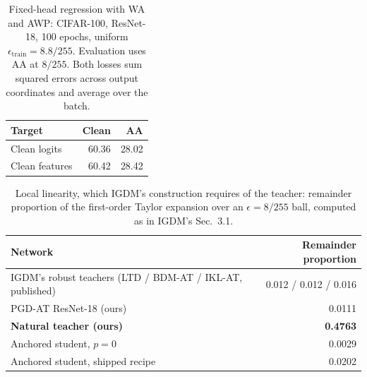 \begin{table}[!htbp]
  \centering \small \setlength{\tabcolsep}{6pt}
  \caption{Fixed-head regression with WA and AWP: CIFAR-100, ResNet-18, 100 epochs,
  uniform $\epsilon_{\mathrm{train}}=8.8/255$. Evaluation uses AA at $8/255$.
  Both losses sum squared errors across output coordinates and average over the batch.}
  \label{tab:regression_stack}
  \begin{tabular}{lrr}
    \toprule
    Target & Clean & AA \\
    \midrule
    Clean logits & 60.36 & 28.02 \\
    Clean features & 60.42 & 28.42 \\
    \bottomrule
  \end{tabular}
\end{table}

\begin{table}[!htbp]
  \centering \small \setlength{\tabcolsep}{4.5pt}
  \caption{Local linearity, which IGDM's construction requires of the teacher: remainder proportion of
  the first-order Taylor expansion over an $\epsilon=8/255$ ball, computed as in IGDM's Sec.~3.1.}
  \label{tab:linearity}
  \begin{tabular}{lr}
    \toprule
    Network & Remainder proportion \\
    \midrule
    IGDM's robust teachers (LTD / BDM-AT / IKL-AT, published) & 0.012 / 0.012 / 0.016 \\
    PGD-AT ResNet-18 (ours)          & 0.0111 \\
    \textbf{Natural teacher (ours)}  & \textbf{0.4763} \\
    Anchored student, $p=0$          & 0.0029 \\
    Anchored student, shipped recipe & 0.0202 \\
    \bottomrule
  \end{tabular}
\end{table}

